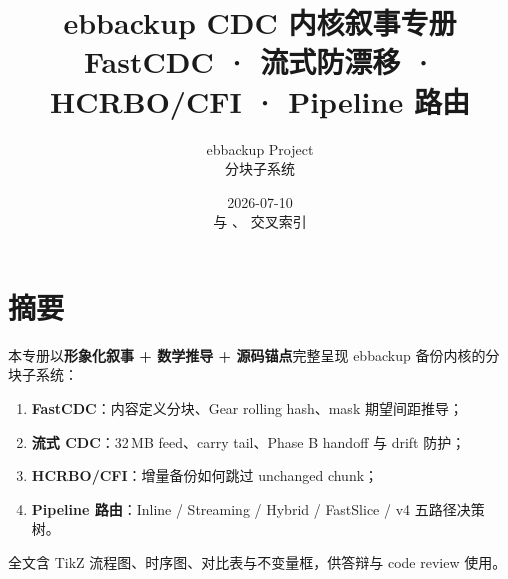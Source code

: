 \documentclass[12pt,a4paper,openany]{ctexbook}
\title{ebbackup CDC 内核叙事专册\\[0.25em]\large FastCDC · 流式防漂移 · HCRBO/CFI · Pipeline 路由}
\author{ebbackup Project\\\filepath{engine\_cpp/} 分块子系统}
\date{2026-07-10\\{\small 与 \filepath{kernel-manual/}、\filepath{CHUNK\_AND\_CDC.md} 交叉索引}}
\begin{document}
\frontmatter
\maketitle
\chapter*{摘要}
本专册以\textbf{形象化叙事 + 数学推导 + 源码锚点}完整呈现 ebbackup 备份内核的分块子系统：
\begin{enumerate}[nosep]
  \item \textbf{FastCDC}：内容定义分块、Gear rolling hash、mask 期望间距推导；
  \item \textbf{流式 CDC}：32\,MB feed、carry tail、Phase B handoff 与 drift 防护；
  \item \textbf{HCRBO/CFI}：增量备份如何跳过 unchanged chunk；
  \item \textbf{Pipeline 路由}：Inline / Streaming / Hybrid / FastSlice / v4 五路径决策树。
\end{enumerate}
全文含 TikZ 流程图、时序图、对比表与不变量框，供答辩与 code review 使用。
\tableofcontents
\listoffigures
\listoftables

\mainmatter








\appendix


\backmatter
\end{document}
